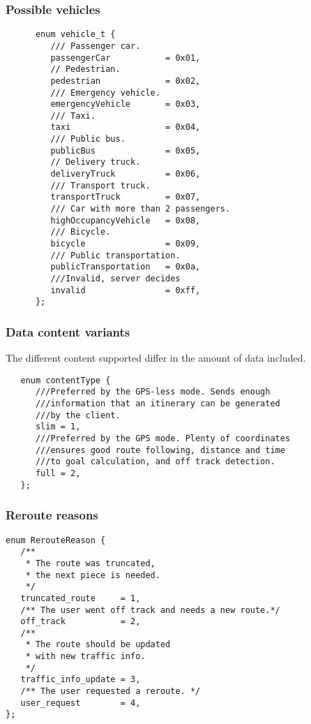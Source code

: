 \documentclass[a4paper]{article}
\begin{document}
\subsubsection{Possible vehicles}
\label{enum:vehicle_t}
\begin{verbatim}
      enum vehicle_t {
         /// Passenger car.
         passengerCar           = 0x01,
         // Pedestrian.
         pedestrian             = 0x02,
         /// Emergency vehicle.
         emergencyVehicle       = 0x03,
         /// Taxi.
         taxi                   = 0x04,
         /// Public bus.
         publicBus              = 0x05,
         // Delivery truck.
         deliveryTruck          = 0x06,
         /// Transport truck.
         transportTruck         = 0x07,
         /// Car with more than 2 passengers.
         highOccupancyVehicle   = 0x08,
         /// Bicycle.
         bicycle                = 0x09,
         /// Public transportation.
         publicTransportation   = 0x0a,
         ///Invalid, server decides
         invalid                = 0xff,
      };
\end{verbatim}

\subsubsection{Data content variants}
\label{enum:contentType}
The different content supported differ in the amount of data
included.
\begin{verbatim}
   enum contentType { 
      ///Preferred by the GPS-less mode. Sends enough 
      ///information that an itinerary can be generated 
      ///by the client.
      slim = 1,
      ///Preferred by the GPS mode. Plenty of coordinates
      ///ensures good route following, distance and time 
      ///to goal calculation, and off track detection.
      full = 2,
   };
\end{verbatim} 

\subsubsection{Reroute reasons}
\begin{verbatim}
enum RerouteReason {
   /**
    * The route was truncated, 
    * the next piece is needed. 
    */
   truncated_route     = 1,
   /** The user went off track and needs a new route.*/
   off_track           = 2,
   /**
    * The route should be updated 
    * with new traffic info. 
    */
   traffic_info_update = 3,
   /** The user requested a reroute. */
   user_request        = 4,
};
\end{verbatim}
\end{document}
